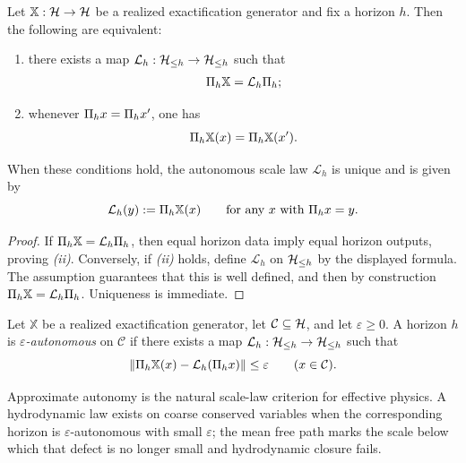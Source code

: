 \begin{proposition}
\label{prop:autonomy-criterion-uniqueness}
Let \(\mathbb X:\mathcal{H}\to\mathcal{H}\) be a realized exactification generator and fix a
horizon \(h\). Then the following are equivalent:
\begin{enumerate}[label=(\roman*), leftmargin=2em, itemsep=0.2em]
\item there exists a map \(\mathcal L_h:\mathcal{H}_{\le h}\to\mathcal{H}_{\le h}\) such that
      \[
      \Pi_{h}\mathbb X=\mathcal L_h\Pi_{h};
      \]
\item whenever \(\Pi_{h}x=\Pi_{h}x'\), one has
      \[
      \Pi_{h}\mathbb X(x)=\Pi_{h}\mathbb X(x').
      \]
\end{enumerate}
When these conditions hold, the autonomous scale law \(\mathcal L_h\) is
unique and is given by
\[
\mathcal L_h(y):=\Pi_{h}\mathbb X(x)
\qquad
\text{for any }x\text{ with }\Pi_{h}x=y.
\]
\end{proposition}

\begin{proof}
If \(\Pi_{h}\mathbb X=\mathcal L_h\Pi_{h}\), then equal horizon data imply
equal horizon outputs, proving \emph{(ii)}. Conversely, if \emph{(ii)} holds,
define \(\mathcal L_h\) on \(\mathcal{H}_{\le h}\) by the displayed formula. The
assumption guarantees that this is well defined, and then by construction
\(\Pi_{h}\mathbb X=\mathcal L_h\Pi_{h}\). Uniqueness is immediate.
\end{proof}

\begin{definition}
\label{def:approximate-autonomy}
Let \(\mathbb X\) be a realized exactification generator, let
\(\mathcal C\subseteq\mathcal{H}\), and let \(\varepsilon\ge 0\). A horizon \(h\) is
\emph{\(\varepsilon\)-autonomous} on \(\mathcal C\) if there exists a map
\(\mathcal L_h:\mathcal{H}_{\le h}\to\mathcal{H}_{\le h}\) such that
\[
\|\Pi_{h}\mathbb X(x)-\mathcal L_h(\Pi_{h}x)\|\le \varepsilon
\qquad
(x\in\mathcal C).
\]
\end{definition}

\begin{remark}
\label{rem:hydrodynamic-approximate-autonomy}
Approximate autonomy is the natural scale-law criterion for effective physics.
A hydrodynamic law exists on coarse conserved variables when the corresponding
horizon is \(\varepsilon\)-autonomous with small \(\varepsilon\); the mean free
path marks the scale below which that defect is no longer small and
hydrodynamic closure fails.
\end{remark}

